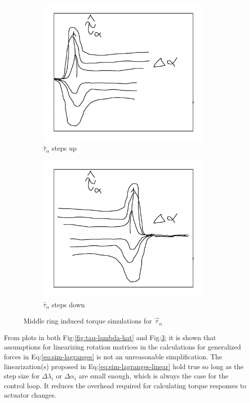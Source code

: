 \begin{figure}[htbp]
\centering
\begin{subfigure}{0.49\textwidth}
\centering
\includegraphics[width=0.95\textwidth]{graphs/tau-alpha-hat-up}
\caption{$\hat{\tau}_\alpha$ steps up}
\label{fig:tau-alpha-hat-up}
\end{subfigure}
\begin{subfigure}{0.49\textwidth}
\centering
\includegraphics[width=0.95\textwidth]{graphs/tau-alpha-hat-down}
\caption{$\hat{\tau}_\alpha$ steps down}
\label{fig:tau-alpha-hat-down}
\end{subfigure}
\caption{Middle ring induced torque simulations for $\vec{\tau}_\alpha$}
\label{fig:tau-alpha-hat}
\end{figure}
\par
From plots in both Fig:\ref{fig:tau-lambda-hat} and Fig:\ref{fig:tau-alpha-hat}; it is shown that assumptions for linearizing rotation matrices in the calculations for generalized forces in Eq:\ref{eq:sim-lagranges} is not an unreasonable simplification. The linearization(s) proposed in Eq:\ref{eq:sim-lagranges-linear} hold true so long as the step size for $\Delta\lambda_i$ or $\Delta\alpha_i$ are small enough, which is always the case for the control loop. It reduces the overhead required for calculating torque responses to actuator changes. 
